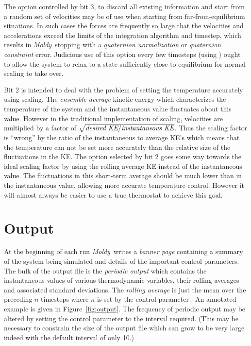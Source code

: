 \documentclass[a4paper,twoside]{report}
\newcommand{\moldy}{\emph{Moldy}}
\begin{document}
The option controlled by bit 3, to discard all existing information
and start from a random set of velocities may be of use when starting
from far-from-equilibrium situations.  In such cases the forces are
frequently so large that the velocities and accelerations exceed the
limits of the integration algorithm and timestep, which results in
\moldy\ stopping with a \emph{quaternion normalization} or
\emph{quaternion constraint} error.  Judicious use of this option
every few timesteps (using ) ought to allow the
system to relax to a state sufficiently close to equilibrium for
normal scaling to take over.

Bit 2 is intended to deal with the problem of setting the temperature
accurately using scaling.  The \emph{ensemble average} kinetic energy
which characterizes the temperature of the system and the
instantaneous value fluctuates about this value.  However in the
traditional implementation of scaling, velocities are multiplied by a
factor of $\sqrt{\emph{desired KE} / {\emph{instantaneous KE}}}$.
Thus the scaling factor is ``wrong'' by the ratio of the instantaneous
to average KE's which means that the temperature can not be set more
accurately than the relative size of the fluctuations in the KE\@.
The option selected by bit 2 goes some way towards the ideal scaling
factor by using the rolling average KE instead of the instantaneous
value.  The fluctuations in this short-term average should be much
lower than in the instantaneous value, allowing more accurate
temperature control.  However it will almost always be easier to use a
true thermostat to achieve this goal.


\section{Output}%
\label{sec:output}
At the beginning of each run \moldy\ writes a \emph{banner page}
containing a summary of the system being simulated and details of the
important control parameters. The bulk of the output file is the
\emph{periodic output} which contains the instantaneous values of
various thermodynamic variables, their rolling averages and associated
standard deviations. The \emph{rolling average} is just the mean over
the preceding $n$ timesteps where $n$ is set by the control parameter
.  An annotated example is given in
Figure~\ref{fig:output}.  The frequency of periodic output may be
altered by setting the control parameter  to
the interval required.  (This may be necessary to constrain the size
of the output file which can grow to be very large indeed with the
default interval of only 10.)
\end{document}
